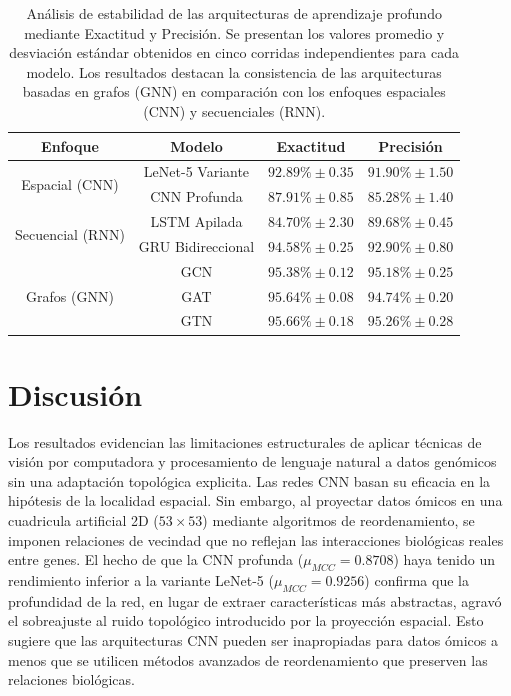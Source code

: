 \documentclass[review,12pt,times,number]{elsarticle}
\begin{document}
\begin{table}[] \scriptsize
\caption{Análisis de estabilidad de las arquitecturas de aprendizaje profundo mediante Exactitud y Precisión. Se presentan los valores promedio y desviación estándar obtenidos en cinco corridas independientes para cada modelo. Los resultados destacan la consistencia de las arquitecturas basadas en grafos (GNN) en comparación con los enfoques espaciales (CNN) y secuenciales (RNN).}
\label{tab:estabilidad_acc_prec}
\centering
\begin{tabular}{cccc}
\hline
\textbf{Enfoque}              & \textbf{Modelo}   & \textbf{Exactitud} & \textbf{Precisión} \\ \hline
\multirow{2}{*}{Espacial (CNN)}   & LeNet-5 Variante & $92.89\% \pm 0.35$ & $91.90\% \pm 1.50$ \\ \cline{2-4} 
                              & CNN Profunda      & $87.91\% \pm 0.85$ & $85.28\% \pm 1.40$ \\ \hline
\multirow{2}{*}{Secuencial (RNN)} & LSTM Apilada     & $84.70\% \pm 2.30$ & $89.68\% \pm 0.45$ \\ \cline{2-4} 
                              & GRU Bidireccional & $94.58\% \pm 0.25$ & $92.90\% \pm 0.80$ \\ \hline
\multirow{3}{*}{Grafos (GNN)} & GCN               & $95.38\% \pm 0.12$ & $95.18\% \pm 0.25$ \\ \cline{2-4} 
                              & GAT               & $95.64\% \pm 0.08$ & $94.74\% \pm 0.20$ \\ \cline{2-4} 
                              & GTN               & $95.66\% \pm 0.18$ & $95.26\% \pm 0.28$ \\ \hline
\end{tabular}
\end{table}


\section{Discusión}

Los resultados evidencian las limitaciones estructurales de aplicar técnicas de visión por computadora y procesamiento de lenguaje natural a datos genómicos sin una adaptación topológica explicita. Las redes CNN basan su eficacia en la hipótesis de la localidad espacial. Sin embargo, al proyectar datos ómicos en una cuadricula artificial 2D ($53 \times 53$) mediante algoritmos de reordenamiento, se imponen relaciones de vecindad que no reflejan las interacciones biológicas reales entre genes. El hecho de que la CNN profunda  ($\mu_{MCC}=0.8708$) haya tenido un rendimiento inferior a la variante LeNet-5  ($\mu_{MCC}=0.9256$) confirma que la profundidad de la red, en lugar de extraer características más abstractas,  agravó el sobreajuste al ruido topológico introducido por la proyección espacial. Esto sugiere que las arquitecturas CNN pueden ser inapropiadas para datos ómicos a menos que se utilicen métodos avanzados de reordenamiento que preserven las relaciones biológicas.
\end{document}
